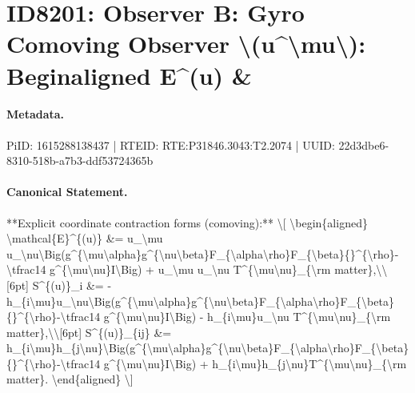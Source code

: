 \section*{ID8201: Observer B: Gyro Comoving Observer \textbackslash{}(u\textasciicircum{}\textbackslash{}mu\textbackslash{}): Beginaligned E\textasciicircum{}(u) \&}
\paragraph{Metadata.}
PiID: 1615288138437 | RTEID: RTE:P31846.3043:T2.2074 | UUID: 22d3dbe6-8310-518b-a7b3-ddf53724365b

\paragraph{Canonical Statement.}
**Explicit coordinate contraction forms (comoving):** \textbackslash{}[ \textbackslash{}begin\{aligned\} \textbackslash{}mathcal\{E\}\textasciicircum{}\{(u)\} \&= u\_\textbackslash{}mu u\_\textbackslash{}nu\textbackslash{}Big(g\textasciicircum{}\{\textbackslash{}mu\textbackslash{}alpha\}g\textasciicircum{}\{\textbackslash{}nu\textbackslash{}beta\}F\_\{\textbackslash{}alpha\textbackslash{}rho\}F\_\{\textbackslash{}beta\}\{\}\textasciicircum{}\{\textbackslash{}rho\}-\textbackslash{}tfrac14 g\textasciicircum{}\{\textbackslash{}mu\textbackslash{}nu\}I\textbackslash{}Big) + u\_\textbackslash{}mu u\_\textbackslash{}nu T\textasciicircum{}\{\textbackslash{}mu\textbackslash{}nu\}\_\{\textbackslash{}rm matter\},\textbackslash{}\textbackslash{}[6pt] S\textasciicircum{}\{(u)\}\_i \&= -h\_\{i\textbackslash{}mu\}u\_\textbackslash{}nu\textbackslash{}Big(g\textasciicircum{}\{\textbackslash{}mu\textbackslash{}alpha\}g\textasciicircum{}\{\textbackslash{}nu\textbackslash{}beta\}F\_\{\textbackslash{}alpha\textbackslash{}rho\}F\_\{\textbackslash{}beta\}\{\}\textasciicircum{}\{\textbackslash{}rho\}-\textbackslash{}tfrac14 g\textasciicircum{}\{\textbackslash{}mu\textbackslash{}nu\}I\textbackslash{}Big) - h\_\{i\textbackslash{}mu\}u\_\textbackslash{}nu T\textasciicircum{}\{\textbackslash{}mu\textbackslash{}nu\}\_\{\textbackslash{}rm matter\},\textbackslash{}\textbackslash{}[6pt] S\textasciicircum{}\{(u)\}\_\{ij\} \&= h\_\{i\textbackslash{}mu\}h\_\{j\textbackslash{}nu\}\textbackslash{}Big(g\textasciicircum{}\{\textbackslash{}mu\textbackslash{}alpha\}g\textasciicircum{}\{\textbackslash{}nu\textbackslash{}beta\}F\_\{\textbackslash{}alpha\textbackslash{}rho\}F\_\{\textbackslash{}beta\}\{\}\textasciicircum{}\{\textbackslash{}rho\}-\textbackslash{}tfrac14 g\textasciicircum{}\{\textbackslash{}mu\textbackslash{}nu\}I\textbackslash{}Big) + h\_\{i\textbackslash{}mu\}h\_\{j\textbackslash{}nu\}T\textasciicircum{}\{\textbackslash{}mu\textbackslash{}nu\}\_\{\textbackslash{}rm matter\}. \textbackslash{}end\{aligned\} \textbackslash{}]

